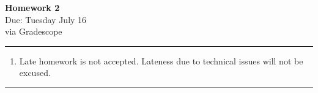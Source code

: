 \documentclass[12pt]{article}
\newif\ifshow
\begin{document}
\begin{center}
\ifshow
  \textbf{\Large Homework 2 Solution}\\
\else
  \textbf{\Large Homework 2}\\
\fi
Due: Tuesday July 16\\via Gradescope\\
\end{center}

\hrule

\vspace{0.2cm}

\begin{enumerate}[$\bullet$]  
\item Late homework is not accepted.  Lateness due to technical issues will not be excused.  
\end{enumerate}

\hrule

\vspace{0.5cm}



\begin{enumerate}


\end{enumerate}
\end{document}

